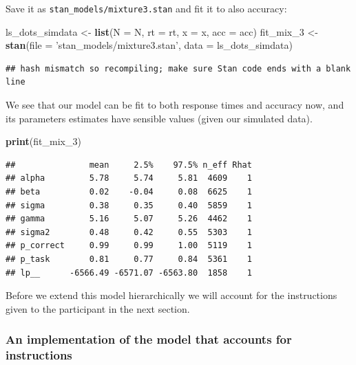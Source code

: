 \documentclass[12pt,]{krantz}
\newenvironment{Shaded}{\begin{snugshade}}{\end{snugshade}}
\newcommand{\DataTypeTok}[1]{\textcolor[rgb]{0.13,0.29,0.53}{#1}}
\newcommand{\DecValTok}[1]{\textcolor[rgb]{0.00,0.00,0.81}{#1}}
\newcommand{\KeywordTok}[1]{\textcolor[rgb]{0.13,0.29,0.53}{\textbf{#1}}}
\newcommand{\NormalTok}[1]{#1}
\newcommand{\StringTok}[1]{\textcolor[rgb]{0.31,0.60,0.02}{#1}}
\theoremstyle{definition}
\theoremstyle{definition}
\theoremstyle{definition}
\theoremstyle{remark}
\begin{document}
Save it as \texttt{stan\_models/mixture3.stan} and fit it to also accuracy:

\begin{Shaded}
\begin{Highlighting}[]
\NormalTok{ls_dots_simdata <-}\StringTok{ }\KeywordTok{list}\NormalTok{(}\DataTypeTok{N =}\NormalTok{ N,}
                        \DataTypeTok{rt =}\NormalTok{ rt,}
                        \DataTypeTok{x =}\NormalTok{ x,}
                        \DataTypeTok{acc =}\NormalTok{ acc)}
\NormalTok{fit_mix_}\DecValTok{3}\NormalTok{ <-}\StringTok{ }\KeywordTok{stan}\NormalTok{(}\DataTypeTok{file =} \StringTok{'stan_models/mixture3.stan'}\NormalTok{,}
               \DataTypeTok{data =}\NormalTok{ ls_dots_simdata)  }
\end{Highlighting}
\end{Shaded}

\begin{verbatim}
## hash mismatch so recompiling; make sure Stan code ends with a blank line
\end{verbatim}

We see that our model can be fit to both response times and accuracy now, and its parameters estimates have sensible values (given our simulated data).

\begin{Shaded}
\begin{Highlighting}[]
\KeywordTok{print}\NormalTok{(fit_mix_}\DecValTok{3}\NormalTok{) }
\end{Highlighting}
\end{Shaded}

\begin{verbatim}
##               mean     2.5%    97.5% n_eff Rhat
## alpha         5.78     5.74     5.81  4609    1
## beta          0.02    -0.04     0.08  6625    1
## sigma         0.38     0.35     0.40  5859    1
## gamma         5.16     5.07     5.26  4462    1
## sigma2        0.48     0.42     0.55  5303    1
## p_correct     0.99     0.99     1.00  5119    1
## p_task        0.81     0.77     0.84  5361    1
## lp__      -6566.49 -6571.07 -6563.80  1858    1
\end{verbatim}

Before we extend this model hierarchically we will account for the instructions given to the participant in the next section.

\hypertarget{an-implementation-of-the-model-that-accounts-for-instructions}{%
\subsubsection{An implementation of the model that accounts for instructions}\label{an-implementation-of-the-model-that-accounts-for-instructions}}
\end{document}
